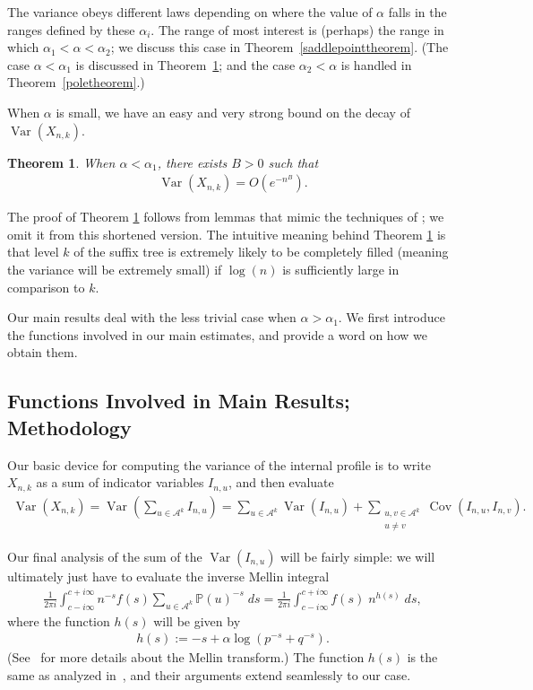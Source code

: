 \documentclass[proceedings]{aofa}
\newtheorem{theorem}{Theorem}
\def\Var{\mathop{\operatorname{Var}}}
\def\Cov{\mathop{\operatorname{Cov}}}
\newcommand{\Iu}{I_{n,u}}
\newcommand{\Iv}{I_{n,v}}
\newcommand{\sumu}{\sum_{u\in\Ak}}
\newcommand{\Ak}{\mathcal{A}^{k}}
\newcommand{\sumuv}{\sum_{\substack{u,v\in\Ak \\ u \neq v}}}
\newcommand{\pro}{\mathbb{P}}
\newcommand{\Pu}{\pro(u)}
\def\Cov{\mathop{\operatorname{Cov}}}
\begin{document}
The variance obeys different laws depending on where the value of $\alpha$ falls in the ranges defined by these $\alpha_{i}$. 
The range of most interest is (perhaps) the range in which $\alpha_1 <
\alpha < \alpha_2$; we discuss this case in Theorem~\ref{saddlepointtheorem}.
(The case $\alpha < \alpha_1$ is discussed in 
Theorem~\ref{smallalphatheorem};
 and the case $\alpha_2<\alpha$ is handled in
Theorem~\ref{poletheorem}.)

When $\alpha$ is small, we have an easy and very strong bound on the decay of $\Var(X_{n,k})$.
\begin{theorem}\label{smallalphatheorem}
When $\alpha < \alpha_{1}$, there exists $B>0$ such that 
\begin{align*}\Var(X_{n,k})=O(e^{-n^{B}}).
\end{align*} 
\end{theorem}

The proof of Theorem \ref{smallalphatheorem} follows from lemmas that
mimic the techniques of \cite{Markthesis}; we omit it from this shortened version. The intuitive meaning behind Theorem \ref{smallalphatheorem}
is that level $k$ of the suffix tree is extremely likely to be
completely filled (meaning the variance will be extremely small) if
$\log(n)$ is sufficiently large in comparison to $k$.

Our main results deal with the less trivial case when $\alpha > \alpha_{1}$. We first introduce the functions involved in our main estimates, and provide a word on how we obtain them. 

\subsection{Functions Involved in Main Results; Methodology}\label{subsec:intro}
Our basic device for computing the variance of the internal profile is to write $X_{n,k}$ as a sum of indicator variables $\Iu$, and then evaluate
\begin{align}\label{newstarequation}
\Var(X_{n,k}) = \Var(\sumu \Iu) = \sumu \Var(\Iu) + \sumuv \Cov(\Iu,\Iv).
\end{align}

Our final analysis of the sum of the $\Var(\Iu)$ will be fairly simple: we will ultimately just have to evaluate the inverse Mellin integral
\begin{align}\label{introinversemellin}
\frac{1}{2 \pi i}\int_{c-i\infty}^{c+i\infty}n^{-s}f(s)\sum_{u \in \Ak}\Pu^{-s}\;ds=\frac{1}{2\pi i}\int_{c-i\infty}^{c+i\infty}f(s)\;n^{h(s)}\;ds,
\end{align}
where the function $h(s)$ will be given by
\begin{align*}
h(s) := -s + \alpha\log(p^{-s}+q^{-s}).
\end{align*}
(See~\cite{PF120} for more details about the Mellin transform.)
The function $h(s)$ is the same as analyzed in~\cite{Park:2009}, and their arguments extend seamlessly to our case. 
\end{document}
